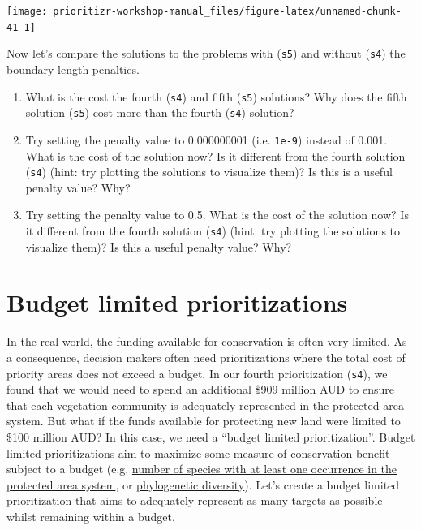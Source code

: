 \documentclass[12pt,]{book}
\providecommand{\tightlist}{%
  \setlength{\itemsep}{0pt}\setlength{\parskip}{0pt}}
\let\BeginKnitrBlock\begin \let\EndKnitrBlock\end
\begin{document}
\begin{center}\texttt{[image: prioritizr-workshop-manual\_files/figure-latex/unnamed-chunk-41-1]} \end{center}

Now let's compare the solutions to the problems with (\texttt{s5}) and
without (\texttt{s4}) the boundary length penalties.

\BeginKnitrBlock{rmdquestion}
\begin{enumerate}
\def\labelenumi{\arabic{enumi}.}
\tightlist
\item
  What is the cost the fourth (\texttt{s4}) and fifth (\texttt{s5})
  solutions? Why does the fifth solution (\texttt{s5}) cost more than
  the fourth (\texttt{s4}) solution?
\item
  Try setting the penalty value to 0.000000001 (i.e. \texttt{1e-9})
  instead of 0.001. What is the cost of the solution now? Is it
  different from the fourth solution (\texttt{s4}) (hint: try plotting
  the solutions to visualize them)? Is this is a useful penalty value?
  Why?
\item
  Try setting the penalty value to 0.5. What is the cost of the solution
  now? Is it different from the fourth solution (\texttt{s4}) (hint: try
  plotting the solutions to visualize them)? Is this a useful penalty
  value? Why?
\end{enumerate}
\EndKnitrBlock{rmdquestion}

\clearpage

\section{Budget limited
prioritizations}\label{budget-limited-prioritizations}

In the real-world, the funding available for conservation is often very
limited. As a consequence, decision makers often need prioritizations
where the total cost of priority areas does not exceed a budget. In our
fourth prioritization (\texttt{s4}), we found that we would need to
spend an additional \$909 million AUD to ensure that each vegetation
community is adequately represented in the protected area system. But
what if the funds available for protecting new land were limited to
\$100 million AUD? In this case, we need a ``budget limited
prioritization''. Budget limited prioritizations aim to maximize some
measure of conservation benefit subject to a budget (e.g.
\href{https://prioritizr.net/reference/add_max_cover_objective.html}{number
of species with at least one occurrence in the protected area system},
or
\href{https://prioritizr.net/reference/add_max_phylo_div_objective.html}{phylogenetic
diversity}). Let's create a budget limited prioritization that aims to
adequately represent as many targets as possible whilst remaining within
a budget.
\end{document}
